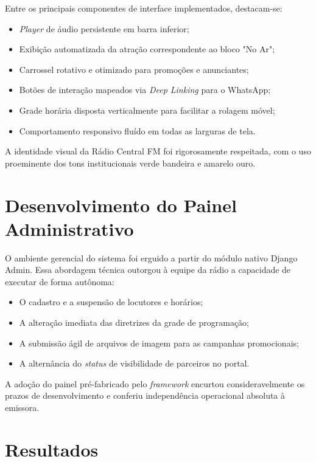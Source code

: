 \documentclass[12pt, openright, oneside, a4paper, brazil]{ads-unipac-abntex2}
\begin{document}
Entre os principais componentes de interface implementados, destacam-se:

\begin{itemize}
    \item \textit{Player} de áudio persistente em barra inferior;
    \item Exibição automatizada da atração correspondente ao bloco "No Ar";
    \item Carrossel rotativo e otimizado para promoções e anunciantes;
    \item Botões de interação mapeados via \textit{Deep Linking} para o WhatsApp;
    \item Grade horária disposta verticalmente para facilitar a rolagem móvel;
    \item Comportamento responsivo fluído em todas as larguras de tela.
\end{itemize}

A identidade visual da Rádio Central FM foi rigorosamente respeitada, com o uso proeminente dos tons institucionais verde bandeira e amarelo ouro.

\section{Desenvolvimento do Painel Administrativo}

O ambiente gerencial do sistema foi erguido a partir do módulo nativo Django Admin. Essa abordagem técnica outorgou à equipe da rádio a capacidade de executar de forma autônoma:

\begin{itemize}
    \item O cadastro e a suspensão de locutores e horários;
    \item A alteração imediata das diretrizes da grade de programação;
    \item A submissão ágil de arquivos de imagem para as campanhas promocionais;
    \item A alternância do \textit{status} de visibilidade de parceiros no portal.
\end{itemize}

A adoção do painel pré-fabricado pelo \textit{framework} encurtou consideravelmente os prazos de desenvolvimento e conferiu independência operacional absoluta à emissora.

\newpage
\section*{Resultados}
\end{document}
